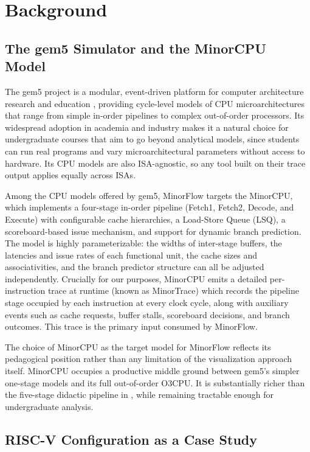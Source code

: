 \documentclass[runningheads,a4paper]{llncs}
\begin{document}
\section{Background}
\label{sec:background}

\subsection{The gem5 Simulator and the MinorCPU Model}

The gem5 project is a modular, event-driven platform for computer architecture research and education \cite{binkert2011gem5}, providing cycle-level models of CPU microarchitectures that range from simple in-order pipelines to complex out-of-order processors. Its widespread adoption in academia and industry makes it a natural choice for undergraduate courses that aim to go beyond analytical models, since students can run real programs and vary microarchitectural parameters without access to hardware. Its CPU models are also ISA-agnostic, so any tool built on their trace output applies equally across ISAs.

Among the CPU models offered by gem5, MinorFlow targets the MinorCPU, which implements a four-stage in-order pipeline (Fetch1, Fetch2, Decode, and Execute) with configurable cache hierarchies, a Load-Store Queue (LSQ), a scoreboard-based issue mechanism, and support for dynamic branch prediction. The model is highly parameterizable: the widths of inter-stage buffers, the latencies and issue rates of each functional unit, the cache sizes and associativities, and the branch predictor structure can all be adjusted independently. Crucially for our purposes, MinorCPU emits a detailed per-instruction trace at runtime (known as MinorTrace) which records the pipeline stage occupied by each instruction at every clock cycle, along with auxiliary events such as cache requests, buffer stalls, scoreboard decisions, and branch outcomes. This trace is the primary input consumed by MinorFlow.

The choice of MinorCPU as the target model for MinorFlow reflects its pedagogical position rather than any limitation of the visualization approach itself. MinorCPU occupies a productive middle ground between gem5's simpler one-stage models and its full out-of-order O3CPU. It is substantially richer than the five-stage didactic pipeline in \cite{patterson2020computer}, while remaining tractable enough for undergraduate analysis. 

\subsection{RISC-V Configuration as a Case Study}
\end{document}
